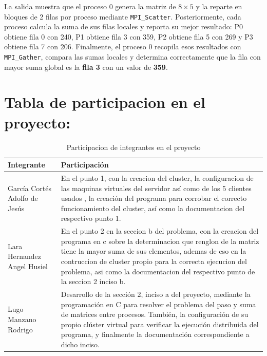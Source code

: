 \documentclass[letterpaper,11pt]{article}
\begin{document}
    La salida muestra que el proceso 0 genera la matriz de $8 \times 5$ y la reparte en bloques de 2 filas por proceso mediante \texttt{MPI\_Scatter}. Posteriormente, cada proceso calcula la suma de sus filas locales y reporta su mejor resultado: P0 obtiene fila 0 con 240, P1 obtiene fila 3 con 359, P2 obtiene fila 5 con 269 y P3 obtiene fila 7 con 206. Finalmente, el proceso 0 recopila esos resultados con \texttt{MPI\_Gather}, compara las sumas locales y determina correctamente que la fila con mayor suma global es la \textbf{fila 3} con un valor de \textbf{359}.


    \section{Tabla de participacion en el proyecto:}
    \begin{table}[H]
        \centering
        \begin{tabular}{|m{7cm}|m{7cm}|}
            \hline
            \cellcolor{orange!35}\centering\LARGE\textbf{Integrante} & \cellcolor{orange!35}\centering\LARGE\textbf{Participación} \tabularnewline
            \hline
            \cellcolor{orange!10}\centering\Large{García Cortés Adolfo de Jesús}  &  En el punto 1, con la creacion del cluster, la configuracion de las maquinas virtuales del servidor así como de los 5 clientes usados , la creación del programa para corrobar el correcto funcionamiento del cluster, así como la documentacion del respectivo punto 1.\\
            \hline
            \cellcolor{orange!10}\centering\Large{Lara Hernandez Angel Husiel} &  En el punto 2 en la seccion b del problema, con la creacion del programa en c sobre la determinacion que renglon de la matriz tiene la mayor suma de sus elementos, ademas de eso en la contruccion de cluster propio para la correcta ejecucion del problema, asi como la documentacion del respectivo punto de la seccion 2 inciso b.\\
            \hline
            \cellcolor{orange!10}\centering\Large{Lugo Manzano Rodrigo} & Desarrollo de la sección 2, inciso a del proyecto, mediante la programación en C para resolver el problema del paso y suma de matrices entre procesos. También, la configuración de su propio clúster virtual para verificar la ejecución distribuida del programa, y finalmente la documentación correspondiente a dicho inciso.\\
            \hline
        \end{tabular}
        \caption{Participacion de integrantes en el proyecto}
        \label{tab:participacion-integrantes}
    \end{table}
\end{document}
